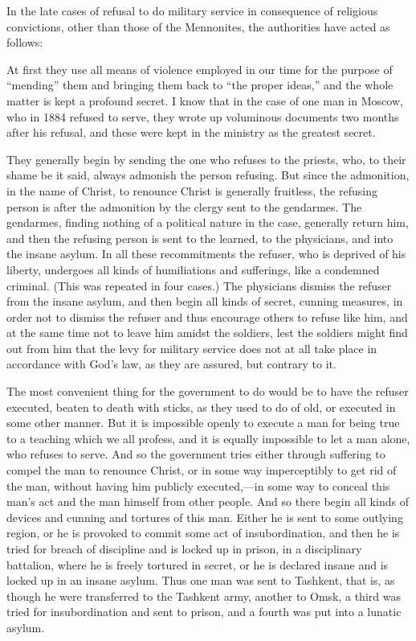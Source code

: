 \documentclass{book}
\begin{document}
In the late cases of refusal to do military service in consequence of religious convictions, other than those of the Mennonites, the authorities have acted as follows:

At first they use all means of violence employed in our time for the purpose of “mending” them and bringing them back to “the proper ideas,” and the whole matter is kept a profound secret. I know that in the case of one man in Moscow, who in 1884 refused to serve, they wrote up voluminous documents two months after his refusal, and these were kept in the ministry as the greatest secret.

They generally begin by sending the one who refuses to the priests, who, to their shame be it said, always admonish the person refusing. But since the admonition, in the name of Christ, to renounce Christ is generally fruitless, the refusing person is after the admonition by the clergy sent to the gendarmes. The gendarmes, finding nothing of a political nature in the case, generally return him, and then the refusing person is sent to the learned, to the physicians, and into the insane asylum. In all these recommitments the refuser, who is deprived of his liberty, undergoes all kinds of humiliations and sufferings, like a condemned criminal. (This was repeated in four cases.) The physicians dismiss the refuser from the insane asylum, and then begin all kinds of secret, cunning measures, in order not to dismiss the refuser and thus encourage others to refuse like him, and at the same time not to leave him amidst the soldiers, lest the soldiers might find out from him that the levy for military service does not at all take place in accordance with God’s law, as they are assured, but contrary to it.

The most convenient thing for the government to do would be to have the refuser executed, beaten to death with sticks, as they used to do of old, or executed in some other manner. But it is impossible openly to execute a man for being true to a teaching which we all profess, and it is equally impossible to let a man alone, who refuses to serve. And so the government tries either through suffering to compel the man to renounce Christ, or in some way imperceptibly to get rid of the man, without having him publicly executed,—in some way to conceal this man’s act and the man himself from other people. And so there begin all kinds of devices and cunning and tortures of this man. Either he is sent to some outlying region, or he is provoked to commit some act of insubordination, and then he is tried for breach of discipline and is locked up in prison, in a disciplinary battalion, where he is freely tortured in secret, or he is declared insane and is locked up in an insane asylum. Thus one man was sent to Tashkent, that is, as though he were transferred to the Tashkent army, another to Omsk, a third was tried for insubordination and sent to prison, and a fourth was put into a lunatic asylum.
\end{document}
